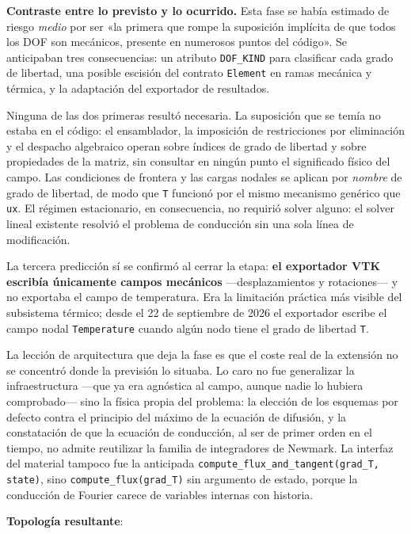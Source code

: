 \documentclass[11pt,oneside]{report}
\begin{document}
\textbf{Contraste entre lo previsto y lo ocurrido.} Esta fase se había estimado de riesgo \textit{medio} por ser «la primera que rompe la suposición implícita de que todos los DOF son mecánicos, presente en numerosos puntos del código». Se anticipaban tres consecuencias: un atributo \texttt{DOF\_KIND} para clasificar cada grado de libertad, una posible escisión del contrato \texttt{Element} en ramas mecánica y térmica, y la adaptación del exportador de resultados.

Ninguna de las dos primeras resultó necesaria. La suposición que se temía no estaba en el código: el ensamblador, la imposición de restricciones por eliminación y el despacho algebraico operan sobre índices de grado de libertad y sobre propiedades de la matriz, sin consultar en ningún punto el significado físico del campo. Las condiciones de frontera y las cargas nodales se aplican por \textit{nombre} de grado de libertad, de modo que \texttt{T} funcionó por el mismo mecanismo genérico que \texttt{ux}. El régimen estacionario, en consecuencia, no requirió solver alguno: el solver lineal existente resolvió el problema de conducción sin una sola línea de modificación.

La tercera predicción sí se confirmó al cerrar la etapa: \textbf{el exportador VTK escribía únicamente campos mecánicos} ---desplazamientos y rotaciones--- y no exportaba el campo de temperatura. Era la limitación práctica más visible del subsistema térmico; desde el 22 de septiembre de 2026 el exportador escribe el campo nodal \texttt{Temperature} cuando algún nodo tiene el grado de libertad \texttt{T}.

La lección de arquitectura que deja la fase es que el coste real de la extensión no se concentró donde la previsión lo situaba. Lo caro no fue generalizar la infraestructura ---que ya era agnóstica al campo, aunque nadie lo hubiera comprobado--- sino la física propia del problema: la elección de los esquemas por defecto contra el principio del máximo de la ecuación de difusión, y la constatación de que la ecuación de conducción, al ser de primer orden en el tiempo, no admite reutilizar la familia de integradores de Newmark. La interfaz del material tampoco fue la anticipada \texttt{compute\_\allowbreak{}flux\_\allowbreak{}and\_\allowbreak{}tangent(grad\_\allowbreak{}T, state)}, sino \texttt{compute\_\allowbreak{}flux(grad\_\allowbreak{}T)} sin argumento de estado, porque la conducción de Fourier carece de variables internas con historia.

\textbf{Topología resultante}:
\end{document}
